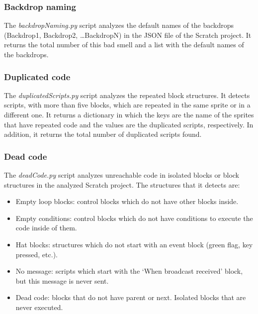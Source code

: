 \subsubsection{Backdrop naming}
\label{subsubsec:backdrop_naming}

The \textit{backdropNaming.py} script analyzes the default names of the backdrops (Backdrop1, Backdrop2, \ldots BackdropN) in the JSON file of the Scratch project. It returns the total number of this bad smell and a list with the default names of the backdrops.

\subsubsection{Duplicated code}
\label{subsubsec:dup_code}

The \textit{duplicatedScripts.py} script analyzes the repeated block structures. It detects scripts, with more than five blocks, which are repeated in the same sprite or in a different one. It returns a dictionary in which the keys are the name of the sprites that have repeated code and the values are the duplicated scripts, respectively. In addition, it returns the total number of duplicated scripts found.

\subsubsection{Dead code}
\label{subsubsec:dead_code}

The \textit{deadCode.py} script analyzes unreachable code in isolated blocks or block structures in the analyzed Scratch project. The structures that it detects are:

\begin{itemize}
    \item Empty loop blocks: control blocks which do not have other blocks inside. 
    \item Empty conditions: control blocks which do not have conditions to execute the code inside of them.
    \item Hat blocks: structures which do not start with an event block (green flag, key pressed, etc.).
    \item No message: scripts which start with the `When broadcast received' block, but this message is never sent. 
    \item Dead code: blocks that do not have parent or next. Isolated blocks that are never executed.
\end{itemize}


